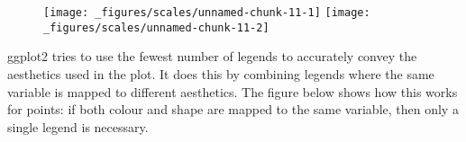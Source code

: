 \begin{Shaded}
\begin{Highlighting}[]
\StringTok{ }\NormalTok{(} \NormalTok{(}\NormalTok{), } \NormalTok{(}\NormalTok{))}
\OperatorTok{$}\StringTok{ }\OperatorTok{$}\NormalTok{, } \NormalTok{(}\NormalTok{, }\NormalTok{, }\NormalTok{))}
\OperatorTok{+}\StringTok{ }
\StringTok{  }\NormalTok{(}\NormalTok{(} \NormalTok{)}
\OperatorTok{+}\StringTok{ }
\StringTok{  }\NormalTok{(}\NormalTok{(} \NormalTok{) }\OperatorTok{+}\StringTok{ }
\StringTok{  }\NormalTok{(} \NormalTok{(} \NormalTok{(} \NormalTok{)))}
\end{Highlighting}
\end{Shaded}

\begin{figure}[H]
  \texttt{[image: \_figures/scales/unnamed-chunk-11-1]}%
  \texttt{[image: \_figures/scales/unnamed-chunk-11-2]}
\end{figure}

ggplot2 tries to use the fewest number of legends to accurately convey
the aesthetics used in the plot. It does this by combining legends where
the same variable is mapped to different aesthetics. The figure below
shows how this works for points: if both colour and shape are mapped to
the same variable, then only a single legend is necessary.

\begin{Shaded}
\begin{Highlighting}[]
\OperatorTok{+}\StringTok{ }\NormalTok{(}\NormalTok{(}
\OperatorTok{+}\StringTok{ }\NormalTok{(}\NormalTok{(}
\OperatorTok{+}\StringTok{ }\NormalTok{(}\NormalTok{(}
\end{Highlighting}
\end{Shaded}

